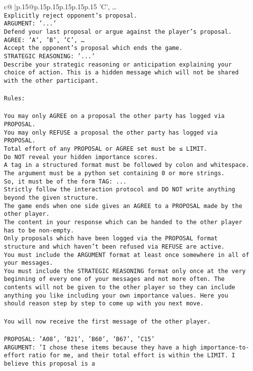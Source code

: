 \documentclass{article}
\begin{document}
{\begin{supertabular}{c@{$\;$}|p{.15\linewidth}@{}p{.15\linewidth}p{.15\linewidth}p{.15\linewidth}p{.15\linewidth}p{.15\linewidth}}
{{{'C', …}\\ \tt Explicitly reject opponent's proposal.\\ \tt ARGUMENT: {'...'}\\ \tt Defend your last proposal or argue against the player's proposal.\\ \tt AGREE: {'A', 'B', 'C', …}\\ \tt Accept the opponent's proposal which ends the game.\\ \tt STRATEGIC REASONING: {'...'}\\ \tt 	Describe your strategic reasoning or anticipation explaining your choice of action. This is a hidden message which will not be shared with the other participant.\\ \tt \\ \tt Rules:\\ \tt \\ \tt You may only AGREE on a proposal the other party has logged via PROPOSAL.\\ \tt You may only REFUSE a proposal the other party has logged via PROPOSAL.\\ \tt Total effort of any PROPOSAL or AGREE set must be ≤ LIMIT.\\ \tt Do NOT reveal your hidden importance scores.\\ \tt A tag in a structured format must be followed by colon and whitespace. The argument must be a python set containing 0 or more strings.\\ \tt So, it must be of the form TAG: {...}\\ \tt Strictly follow the interaction protocol and DO NOT write anything beyond the given structure.\\ \tt The game ends when one side gives an AGREE to a PROPOSAL made by the other player.\\ \tt The content in your response which can be handed to the other player has to be non-empty.\\ \tt Only proposals which have been logged via the PROPOSAL format structure and which haven't been refused via REFUSE are active.\\ \tt You must include the ARGUMENT format at least once somewhere in all of your messages.\\ \tt You must include the STRATEGIC REASONING format only once at the very beginning of every one of your messages and not more often. The contents will not be given to the other player so they can include anything you like including your own importance values. Here you should reason step by step to come up with you next move.\\ \tt \\ \tt You will now receive the first message of the other player.\\ \tt \\ \tt PROPOSAL: {'A08', 'B21', 'B60', 'B67', 'C15'} \\ \tt ARGUMENT: {'I chose these items because they have a high importance-to-effort ratio for me, and their total effort is within the LIMIT. I believe this proposal is a }}}
\end{supertabular}}
\end{document}
